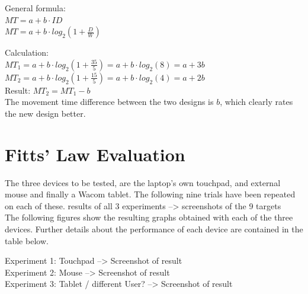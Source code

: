 \documentclass[a4paper,twoside,10pt]{article}
\begin{document}
General formula: \\
$MT = a + b \cdot ID$ \\
$MT = a + b \cdot log_2 (1 + \frac{D}{W})$ 

Calculation: \\
$MT_1 = a + b \cdot log_2 (1 + \frac{35}{5}) = a + b \cdot log_2(8) = a + 3b$ \\
$MT_2 = a + b \cdot log_2 (1 + \frac{15}{5}) = a + b \cdot log_2(4) = a + 2b$ \\
Result: $MT_2 = MT_1 - b$ \\
The movement time difference between the two designs is $b$, which clearly rates the new design better.

\section{Fitts' Law Evaluation}
The three devices to be tested, are the laptop's own touchpad, and external mouse and finally a Wacom tablet. The following nine trials have been repeated on each of these.
results of all 3 experiments --> screenshots of the 9 targets\\

The following figures show the resulting graphs obtained with each of the three devices. Further details about the performance of each device are contained in the table below.

Experiment 1: Touchpad --> Screenshot of result\\
Experiment 2: Mouse --> Screenshot of result\\
Experiment 3: Tablet / different User? --> Screenshot of result




\vspace{1cm}

\end{document}
